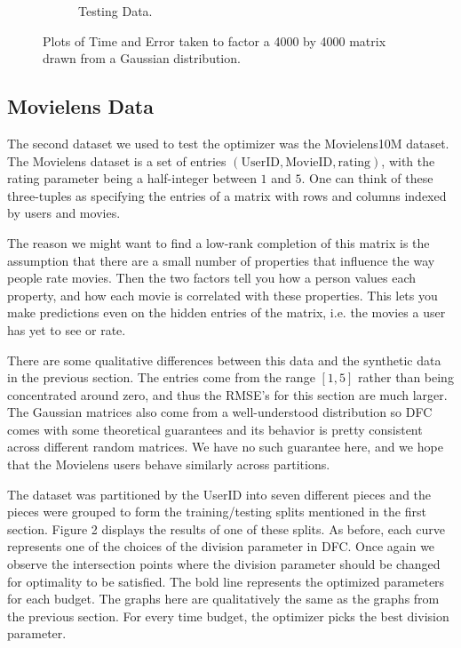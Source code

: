 \begin{figure}
\begin{subfigure}[b]{.45\textwidth}
\begin{center}
		\caption{Testing Data.}
\end{center}
	\end{subfigure}
\hfill
	\caption{Plots of Time and Error taken to factor a 4000 by 4000 matrix drawn from a Gaussian distribution.}	
\end{figure}

\subsection{Movielens Data}
The second dataset we used to test the optimizer was the Movielens10M dataset. The Movielens dataset is a set of entries $(\text{UserID},\text{MovieID},\text{rating})$, with the rating parameter being a half-integer between $1$ and $5$. One can think of these three-tuples as specifying the entries of a matrix with rows and columns indexed by users and movies. 

The reason we might want to find a low-rank completion of this matrix is the assumption that there are a small number of properties that influence the way people rate movies. Then the two factors tell you how a person values each property, and how each movie is correlated with these properties. This lets you make predictions even on the hidden entries of the matrix, i.e. the movies a user has yet to see or rate. 

There are some qualitative differences between this data and the synthetic data in the previous section. The entries come from the range $[1,5]$ rather than being concentrated around zero, and thus the RMSE's for this section are much larger. The Gaussian matrices also come from a well-understood distribution so DFC comes with some theoretical guarantees and its behavior is pretty consistent across different random matrices. We have no such guarantee here, and we hope that the Movielens users behave similarly across partitions. 

The dataset was partitioned by the UserID into seven different pieces and the pieces were grouped to form the training/testing splits mentioned in the first section. Figure 2 displays the results of one of these splits. As before, each curve represents one of the choices of the division parameter in DFC. Once again we observe the intersection points where the division parameter should be changed for optimality to be satisfied. The bold line represents the optimized parameters for each budget. The graphs here are qualitatively the same as the graphs from the previous section. For every time budget, the optimizer picks the best division parameter. 

